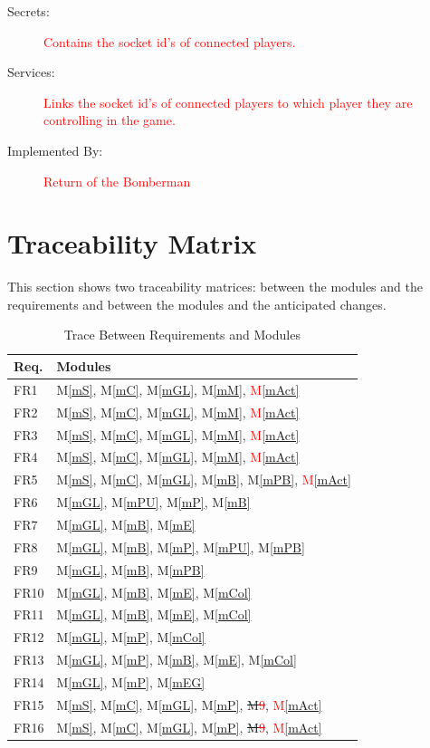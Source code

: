 \documentclass[12pt, titlepage]{article}
\newcommand{\mref}[1]{M\ref{#1}}
\begin{document}
\begin{description}
\item[Secrets:]\textcolor{red}{Contains the socket id's of connected players.}
\item[Services:]\textcolor{red}{ Links the socket id's of connected players to which player they are controlling in the game.}
\item[Implemented By:]\textcolor{red}{ Return of the Bomberman}
\end{description}



\section{Traceability Matrix} \label{SecTM}

This section shows two traceability matrices: between the modules and the
requirements and between the modules and the anticipated changes.

\begin{table}[H]
\centering
\begin{tabular}{p{} p{}}
\toprule
\textbf{Req.} & \textbf{Modules}\\
\midrule
FR1 & \mref{mS}, \mref{mC}, \mref{mGL}, \mref{mM}, \textcolor{red}{\mref{mAct}}\\
FR2 & \mref{mS}, \mref{mC}, \mref{mGL}, \mref{mM}, \textcolor{red}{\mref{mAct}}\\
FR3 & \mref{mS}, \mref{mC}, \mref{mGL}, \mref{mM}, \textcolor{red}{\mref{mAct}}\\
FR4 & \mref{mS}, \mref{mC}, \mref{mGL}, \mref{mM}, \textcolor{red}{\mref{mAct}}\\
FR5 & \mref{mS}, \mref{mC}, \mref{mGL}, \mref{mB}, \mref{mPB}, \textcolor{red}{\mref{mAct}}\\
FR6 & \mref{mGL}, \mref{mPU}, \mref{mP}, \mref{mB}\\
FR7 & \mref{mGL}, \mref{mB}, \mref{mE}\\
FR8 & \mref{mGL}, \mref{mB}, \mref{mP}, \mref{mPU}, \mref{mPB}\\
FR9 & \mref{mGL}, \mref{mB}, \mref{mPB}\\
FR10 & \mref{mGL}, \mref{mB}, \mref{mE}, \mref{mCol}\\
FR11 & \mref{mGL}, \mref{mB}, \mref{mE}, \mref{mCol}\\
FR12 & \mref{mGL}, \mref{mP}, \mref{mCol}\\
FR13 & \mref{mGL}, \mref{mP}, \mref{mB}, \mref{mE}, \mref{mCol}\\
FR14 & \mref{mGL}, \mref{mP}, \mref{mEG}\\
FR15 & \mref{mS}, \mref{mC}, \mref{mGL}, \mref{mP}, \st{M}\textcolor{red}{\st{9}}, \textcolor{red}{\mref{mAct}}\\
FR16 & \mref{mS}, \mref{mC}, \mref{mGL}, \mref{mP}, \st{M}\textcolor{red}{\st{9}}, \textcolor{red}{\mref{mAct}}\\
\bottomrule
\end{tabular}
\caption{Trace Between Requirements and Modules}
\label{TblRT}
\end{table}
\end{document}
